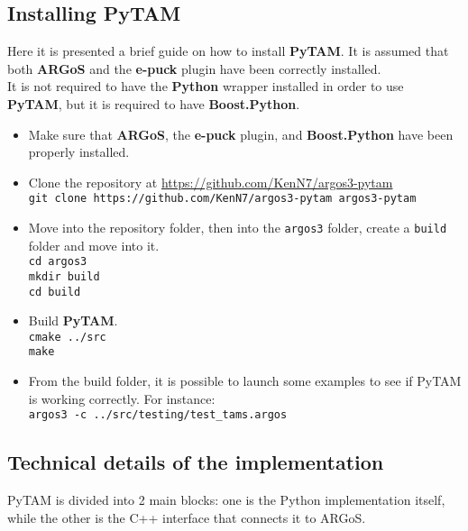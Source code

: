 \documentclass[
12pt,
a4paper,
oneside,
headinclude,
footinclude]{article}
\theoremstyle{definition} %
\begin{document}
\subsection{Installing PyTAM}
Here it is presented a brief guide on how to install \textbf{PyTAM}. It is assumed that both \textbf{ARGoS} and the \textbf{e-puck} plugin have been correctly installed. \\
It is not required to have the \textbf{Python} wrapper installed in order to use \textbf{PyTAM}, but it is required to have \textbf{Boost.Python}.

\begin{itemize}
    \item Make sure that \textbf{ARGoS}, the \textbf{e-puck} plugin, and \textbf{Boost.Python} have been properly installed.
    
    \item Clone the repository at \href{https://github.com/KenN7/argos3-pytam}{https://github.com/KenN7/argos3-pytam}\\
    \-\quad\texttt{git clone https://github.com/KenN7/argos3-pytam argos3-pytam}
    
    \item Move into the repository folder, then into the \texttt{argos3} folder, create a \texttt{build} folder and move into it.\\
    \-\quad\texttt{cd argos3}\\
    \-\quad\texttt{mkdir build}\\
    \-\quad\texttt{cd build}
    
    \item Build \textbf{PyTAM}.\\
    \-\quad\texttt{cmake ../src}\\
    \-\quad\texttt{make}
    
    \item From the build folder, it is possible to launch some examples to see if PyTAM is working correctly. For instance:\\
    \-\quad\texttt{argos3 -c ../src/testing/test\_tams.argos}
\end{itemize}

\newpage

\subsection{Technical details of the implementation}
PyTAM is divided into 2 main blocks: one is the Python implementation itself, while the other is the C++ interface that connects it to ARGoS.
\end{document}
